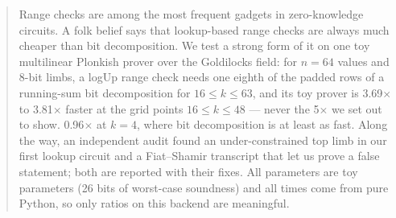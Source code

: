 \begin{abstract}
Range checks are among the most frequent gadgets in zero-knowledge circuits. A folk belief says that
lookup-based range checks are always much cheaper than bit decomposition. We test a strong form of it on one
toy multilinear Plonkish prover over the Goldilocks field: for $n = 64$ values and 8-bit limbs, a logUp range
check needs one eighth of the padded rows of a running-sum bit decomposition for $16 \le k \le 63$, and its
toy prover is 3.69$\times$ to 3.81$\times$ faster at the grid points $16 \le k \le 48$ ---
never the 5$\times$ we set out to show. %
0.96$\times$ at $k = 4$, where bit decomposition is at least as fast. Along the way, an independent audit found an
under-constrained top limb in our first lookup circuit and a Fiat--Shamir transcript that let us prove a false
statement; both are reported with their fixes. All parameters are toy parameters (26 bits of
worst-case soundness) and all times come from pure Python, so only ratios on this backend are meaningful.
\end{abstract}
